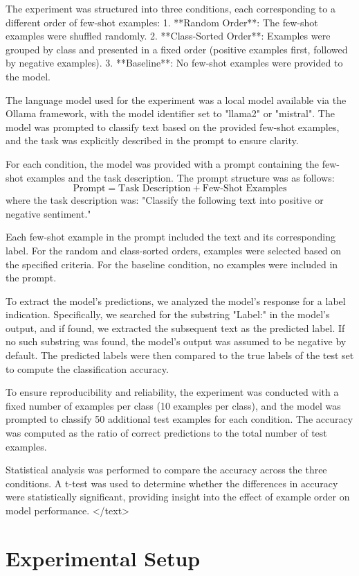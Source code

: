 \documentclass{article}
\begin{document}
The experiment was structured into three conditions, each corresponding to a different order of few-shot examples:
1. **Random Order**: The few-shot examples were shuffled randomly.
2. **Class-Sorted Order**: Examples were grouped by class and presented in a fixed order (positive examples first, followed by negative examples).
3. **Baseline**: No few-shot examples were provided to the model.

The language model used for the experiment was a local model available via the Ollama framework, with the model identifier set to "llama2" or "mistral". The model was prompted to classify text based on the provided few-shot examples, and the task was explicitly described in the prompt to ensure clarity.

For each condition, the model was provided with a prompt containing the few-shot examples and the task description. The prompt structure was as follows:
$$
\text{Prompt} = \text{Task Description} + \text{Few-Shot Examples}
$$
where the task description was: "Classify the following text into positive or negative sentiment."

Each few-shot example in the prompt included the text and its corresponding label. For the random and class-sorted orders, examples were selected based on the specified criteria. For the baseline condition, no examples were included in the prompt.

To extract the model's predictions, we analyzed the model's response for a label indication. Specifically, we searched for the substring "Label:" in the model's output, and if found, we extracted the subsequent text as the predicted label. If no such substring was found, the model's output was assumed to be negative by default. The predicted labels were then compared to the true labels of the test set to compute the classification accuracy.

To ensure reproducibility and reliability, the experiment was conducted with a fixed number of examples per class (10 examples per class), and the model was prompted to classify 50 additional test examples for each condition. The accuracy was computed as the ratio of correct predictions to the total number of test examples.

Statistical analysis was performed to compare the accuracy across the three conditions. A t-test was used to determine whether the differences in accuracy were statistically significant, providing insight into the effect of example order on model performance.
</text>
\section{Experimental Setup}
\end{document}
